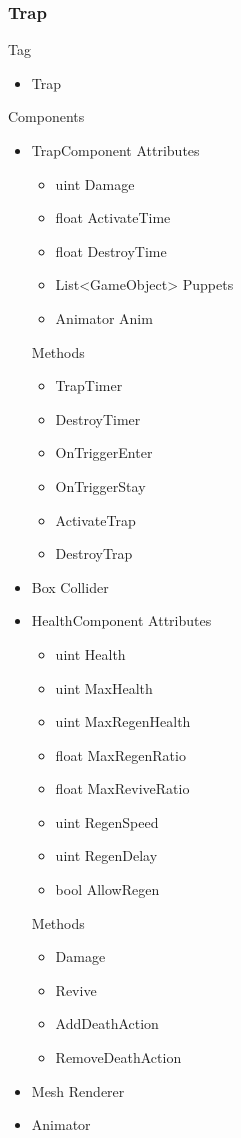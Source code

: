 \documentclass[11pt]{article}
\begin{document}
\subsubsection{Trap}
Tag
\begin{itemize}
	\item Trap
\end{itemize}
Components
\begin{itemize}
	\item TrapComponent
	\newline Attributes
	\begin{itemize}
		\item uint Damage
		\item float ActivateTime
		\item float DestroyTime
		\item List<GameObject> Puppets
		\item Animator Anim
	\end{itemize}
	Methods
	\begin{itemize}
		\item TrapTimer
		\item DestroyTimer
		\item OnTriggerEnter
		\item OnTriggerStay
		\item ActivateTrap
		\item DestroyTrap
	\end{itemize}
	\item Box Collider
	\item HealthComponent
	\newline Attributes
	\begin{itemize}
		\item uint Health
		\item uint MaxHealth
		\item uint MaxRegenHealth
		\item float MaxRegenRatio
		\item float MaxReviveRatio
		\item uint RegenSpeed
		\item uint RegenDelay
		\item bool AllowRegen
	\end{itemize}
	Methods
	\begin{itemize}
		\item Damage
		\item Revive
		\item AddDeathAction
		\item RemoveDeathAction
	\end{itemize}
	\item Mesh Renderer
	\item Animator
\end{itemize}
\end{document}
